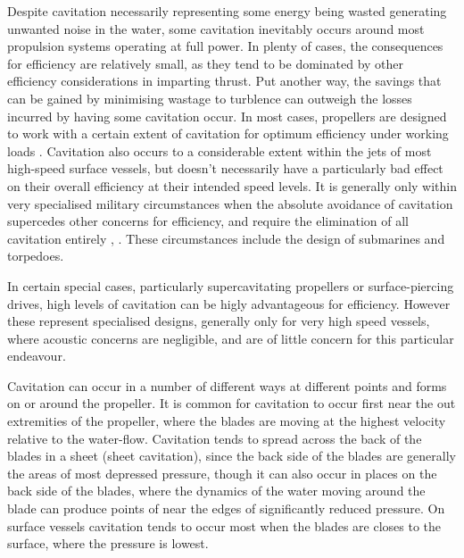 \documentclass{article}\usepackage[]{graphicx}\usepackage[]{color}
\begin{document}
\begin{appendices}
Despite cavitation necessarily representing some energy being wasted generating unwanted noise in the water, some cavitation inevitably occurs around most propulsion systems operating at full power.  In plenty of cases, the consequences for efficiency are relatively small, as they tend to be dominated by other efficiency considerations in imparting thrust.  Put another way, the savings that can be gained by minimising wastage to turblence can outweigh the losses incurred by having some cavitation occur.  In most cases, propellers are designed to work with a certain extent of cavitation for optimum efficiency under working loads \parencite{shin2015}. Cavitation also occurs to a considerable extent within the jets of most high-speed surface vessels, but doesn't necessarily have a particularly bad effect on their overall efficiency at their intended speed levels.  It is generally only within very specialised military circumstances when the absolute avoidance of cavitation supercedes other concerns for efficiency, and require the elimination of all cavitation entirely \parencite{mollard2011}, \parencite{lewis1988}.  These circumstances include the design of submarines and torpedoes.

In certain special cases, particularly supercavitating propellers or surface-piercing drives, high levels of cavitation can be higly advantageous for efficiency.  However these represent specialised designs, generally only for very high speed vessels, where acoustic concerns are negligible, and are of little concern for this particular endeavour.

Cavitation can occur in a number of different ways at different points and forms on or around the propeller.  It is common for cavitation to occur first near the out extremities of the propeller, where the blades are moving at the highest velocity relative to the water-flow.  Cavitation tends to spread across the back of the blades in a sheet (sheet cavitation), since the back side of the blades are generally the areas of most depressed pressure, though it can also occur in places on the back side of the blades, where the dynamics of the water moving around the blade can produce points of near the edges of significantly reduced pressure.   On surface vessels cavitation tends to occur most when the blades are closes to the surface, where the pressure is lowest.


\end{appendices}
\end{document}
